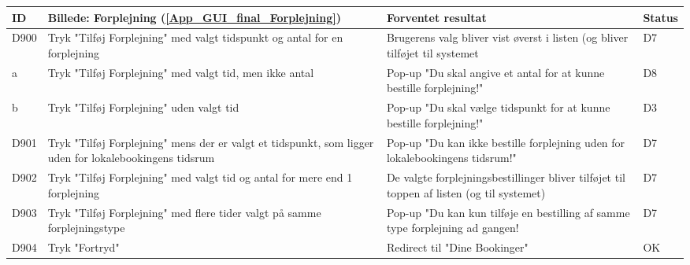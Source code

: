 \begin{tabular}{ |p{0.85cm}| p{5.5cm} | p{8.65cm} | p{1cm} | }
\hline
\textbf{ID} & \textbf{Billede: Forplejning (\ref{App_GUI_final_Forplejning})}  & \textbf{Forventet resultat} & \textbf{Status}\\ 
\hline
D900 & Tryk "Tilføj Forplejning" med valgt tidspunkt og antal for en forplejning & Brugerens valg bliver vist øverst i listen (og bliver tilføjet til systemet & D7 \\
\hline
a & Tryk "Tilføj Forplejning" med valgt tid, men ikke antal & Pop-up "Du skal angive et antal for at kunne bestille forplejning!" & D8 \\
\hline
b & Tryk "Tilføj Forplejning" uden valgt tid & Pop-up "Du skal vælge tidspunkt for at kunne bestille forplejning!" & D3 \\
\hline
D901 & Tryk "Tilføj Forplejning" mens der er valgt et tidspunkt, som ligger uden for lokalebookingens tidsrum & Pop-up "Du kan ikke bestille forplejning uden for lokalebookingens tidsrum!" & D7 \\
\hline
D902 & Tryk "Tilføj Forplejning" med valgt tid og antal for mere end 1 forplejning & De valgte forplejningsbestillinger bliver tilføjet til toppen af listen (og til systemet) & D7 \\
\hline
D903 & Tryk "Tilføj Forplejning" med flere tider valgt på samme forplejningstype & Pop-up "Du kan kun tilføje en bestilling af samme type forplejning ad gangen! & D7 \\
\hline
D904 & Tryk "Fortryd" & Redirect til "Dine Bookinger" & OK \\
\hline
\end{tabular}

